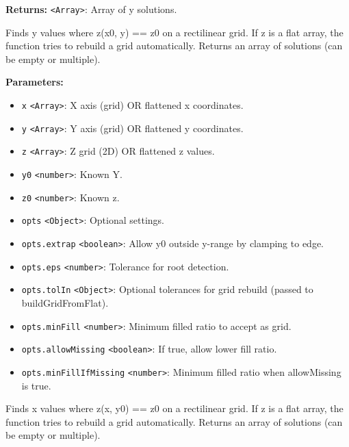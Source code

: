 \documentclass[12pt,a4paper]{article}
\begin{document}
\noindent \textbf{Returns:} \texttt{<Array>}: Array of y solutions.

\noindent Finds y values where z(x0, y) == z0 on a rectilinear grid.
If z is a flat array, the function tries to rebuild a grid automatically.
Returns an array of solutions (can be empty or multiple).

\vspace{5mm}
\noindent {}


\noindent \textbf{Parameters:}
\begin{itemize}
  \item \texttt{x} \texttt{<Array>}: X axis (grid) OR flattened x coordinates.
  \item \texttt{y} \texttt{<Array>}: Y axis (grid) OR flattened y coordinates.
  \item \texttt{z} \texttt{<Array>}: Z grid (2D) OR flattened z values.
  \item \texttt{y0} \texttt{<number>}: Known Y.
  \item \texttt{z0} \texttt{<number>}: Known z.
  \item \texttt{opts} \texttt{<Object>}: Optional settings.
  \item \texttt{opts.extrap} \texttt{<boolean>}: Allow y0 outside y-range by clamping to edge.
  \item \texttt{opts.eps} \texttt{<number>}: Tolerance for root detection.
  \item \texttt{opts.tolIn} \texttt{<Object>}: Optional tolerances for grid rebuild (passed to buildGridFromFlat).
  \item \texttt{opts.minFill} \texttt{<number>}: Minimum filled ratio to accept as grid.
  \item \texttt{opts.allowMissing} \texttt{<boolean>}: If true, allow lower fill ratio.
  \item \texttt{opts.minFillIfMissing} \texttt{<number>}: Minimum filled ratio when allowMissing is true.
\end{itemize}

\noindent Finds x values where z(x, y0) == z0 on a rectilinear grid.
If z is a flat array, the function tries to rebuild a grid automatically.
Returns an array of solutions (can be empty or multiple).
\end{document}
